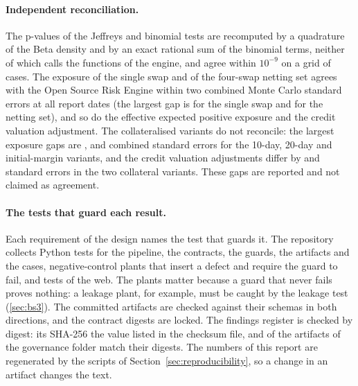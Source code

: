 \paragraph{Independent reconciliation.} The p-values of the Jeffreys and binomial tests are recomputed by a quadrature of the Beta density and by an exact rational sum of the binomial terms, neither of which calls the functions of the engine, and agree within $10^{-9}$ on a grid of \pxTwoGridCases{} cases. The exposure of the single swap and of the four-swap netting set agrees with the Open Source Risk Engine \pxTwoOreVersion{} within two combined Monte Carlo standard errors at all \pxTwoSingleDates{} report dates (the largest gap is \pxTwoSingleMax{} for the single swap and \pxTwoNettingMax{} for the netting set), and so do the effective expected positive exposure and the credit valuation adjustment. The collateralised variants do not reconcile: the largest exposure gaps are \pxTwoCsaTenMax{}, \pxTwoCsaTwentyMax{} and \pxTwoImMax{} combined standard errors for the 10-day, 20-day and initial-margin variants, and the credit valuation adjustments differ by \pxTwoCsaTenCva{} and \pxTwoCsaTwentyCva{} standard errors in the two collateral variants. These gaps are reported and not claimed as agreement.

\paragraph{The tests that guard each result.} Each requirement of the design names the test that guards it. The repository collects \rsPytest{} Python tests for the pipeline, the contracts, the guards, the artifacts and the cases, \rsAdversarial{} negative-control plants that insert a defect and require the guard to fail, and \rsVitest{} tests of the web. The plants matter because a guard that never fails proves nothing: a leakage plant, for example, must be caught by the leakage test (\cref{sec:bs3}). The committed artifacts are checked against their schemas in both directions, and the contract digests are locked. The findings register is checked by digest: its SHA-256 \rsShaFindingsMatch{} the value listed in the checksum file, and \rsShaMatching{} of the \rsShaEntries{} artifacts of the governance folder match their digests. The numbers of this report are regenerated by the scripts of Section~\ref{sec:reproducibility}, so a change in an artifact changes the text.

